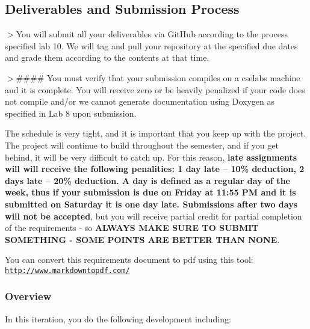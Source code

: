 \subsection*{Deliverables and Submission Process}

$>$You will submit all your deliverables via Git\+Hub according to the process specified lab 10. We will tag and pull your repository at the specified due dates and grade them according to the contents at that time.

$>$\#\#\#\# You must verify that your submission compiles on a cselabs machine and it is complete. You will receive zero or be heavily penalized if your code does not compile and/or we cannot generate documentation using Doxygen as specified in Lab 8 upon submission.

The schedule is very tight, and it is important that you keep up with the project. The project will continue to build throughout the semester, and if you get behind, it will be very difficult to catch up. For this reason, {\bfseries late assignments will will receive the following penalities\+: 1 day late -- 10\% deduction, 2 days late -- 20\% deduction. A day is defined as a regular day of the week, thus if your submission is due on Friday at 11\+:55 PM and it is submitted on Saturday it is one day late. Submissions after two days will not be accepted}, but you will receive partial credit for partial completion of the requirements -\/ so {\bfseries A\+L\+W\+A\+YS M\+A\+KE S\+U\+RE TO S\+U\+B\+M\+IT S\+O\+M\+E\+T\+H\+I\+NG -\/ S\+O\+ME P\+O\+I\+N\+TS A\+RE B\+E\+T\+T\+ER T\+H\+AN N\+O\+NE}.

You can convert this requirements document to pdf using this tool\+: \href{http://www.markdowntopdf.com/}{\tt http\+://www.\+markdowntopdf.\+com/}





\subsubsection*{Overview}

In this iteration, you do the following development including\+:


